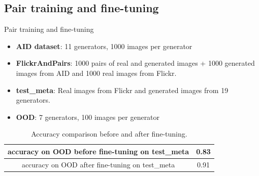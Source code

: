 \documentclass[11pt,compress]{beamer} %
\begin{document}
\subsection{Pair training and fine-tuning}
\begin{frame}{Pair training and fine-tuning}
  \begin{itemize}
    \item \textbf{AID dataset}: 11 generators, 1000 images per generator
    \item \textbf{FlickrAndPairs}: 1000 pairs of real and generated images + 1000 generated images from AID and 1000 real images from Flickr.
    \item \textbf{test\_meta}: Real images from Flickr and generated images from 19 generators.
    \item \textbf{OOD}: 7 generators, 100 images per generator
  \end{itemize}
  \begin{table}[H]
    \centering
    \begin{tabular}{|c|c|}
        \hline
        accuracy on OOD before fine-tuning on test\_meta & 0.83 \\
        \hline
        accuracy on OOD after fine-tuning on test\_meta & 0.91 \\
        \hline
    \end{tabular}
    \caption{Accuracy comparison before and after fine-tuning.}
    \label{tab:fine-tuning}
\end{table}
\end{frame}

\end{document}
